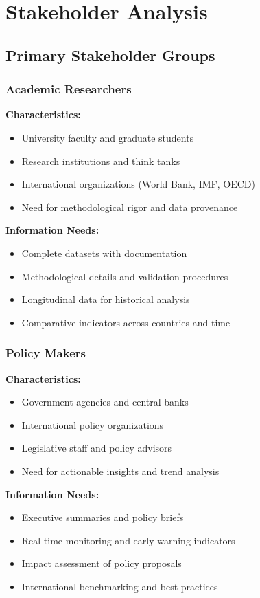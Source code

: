 \documentclass[11pt,a4paper]{article}
\begin{document}
\section{Stakeholder Analysis}

\subsection{Primary Stakeholder Groups}

\subsubsection{Academic Researchers}
\textbf{Characteristics:}
\begin{itemize}
    \item University faculty and graduate students
    \item Research institutions and think tanks
    \item International organizations (World Bank, IMF, OECD)
    \item Need for methodological rigor and data provenance
\end{itemize}

\textbf{Information Needs:}
\begin{itemize}
    \item Complete datasets with documentation
    \item Methodological details and validation procedures
    \item Longitudinal data for historical analysis
    \item Comparative indicators across countries and time
\end{itemize}

\subsubsection{Policy Makers}
\textbf{Characteristics:}
\begin{itemize}
    \item Government agencies and central banks
    \item International policy organizations
    \item Legislative staff and policy advisors
    \item Need for actionable insights and trend analysis
\end{itemize}

\textbf{Information Needs:}
\begin{itemize}
    \item Executive summaries and policy briefs
    \item Real-time monitoring and early warning indicators
    \item Impact assessment of policy proposals
    \item International benchmarking and best practices
\end{itemize}
\end{document}
